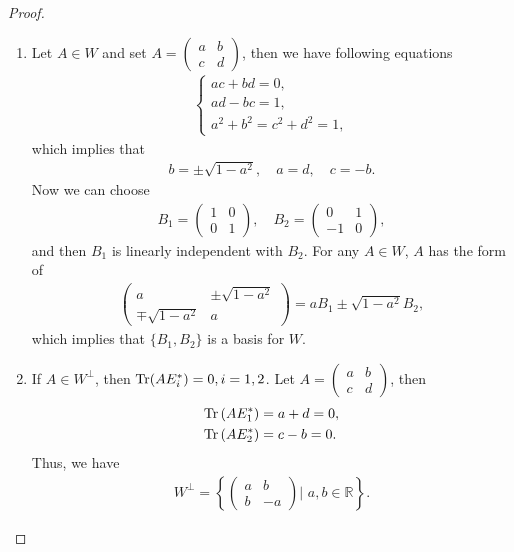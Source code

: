 \documentclass[11pt]{article}
\theoremstyle{definition}
\numberwithin{equation}{subsection}
\begin{document}
\begin{proof}
~\begin{enumerate}[label=(\alph*)]
    \item Let $A \in W$ and set $A = \begin{pmatrix} a & b \\ c & d
    \end{pmatrix}$, then we have following equations
    \begin{align*}
        \begin{cases}
            ac + bd = 0, \\
            ad - bc = 1, \\
            a^2 + b^2 = c^2 + d^2 = 1,
        \end{cases}
    \end{align*}
    which implies that
    \begin{align*}
        b = \pm \sqrt{1 - a^2}, \quad a = d, \quad c = -b.
    \end{align*}
    Now we can choose
    \begin{align*}
        B_1 = \begin{pmatrix} 1 & 0 \\ 0 & 1 \end{pmatrix},\quad 
        B_2 = \begin{pmatrix} 0 & 1 \\ -1 & 0 \end{pmatrix},
    \end{align*}
    and then $B_1$ is linearly independent with $B_2$. For any $A \in W$, $A$ has the form of
    \begin{align*}
        \begin{pmatrix} 
            a & \pm \sqrt{1 - a^2} \\ 
            \mp \sqrt{1 - a^2} & a
        \end{pmatrix} = a B_1 \pm \sqrt{1 - a^2} B_2,
    \end{align*}
    which implies that $\{B_1, B_2\}$ is a basis for $W$.
    
    \item If $A \in W^\bot$, then $\Tr(AE_i^*) = 0, i = 1, 2$. Let $A = \begin{pmatrix} a & b \\ c & d \end{pmatrix}$, then 
    \begin{align*}
        \Tr\left(AE_1^*\right) & = a + d = 0, \\
        \Tr\left(AE_2^*\right) & = c - b = 0.
    \end{align*}
    Thus, we have
    \begin{align*}
        W^\bot = \left\{\begin{pmatrix} a & b \\ b & -a \end{pmatrix} \Bigg| \,\, a, b \in \mathbb{R} \right\}.
    \end{align*}
    

\end{enumerate}
\end{proof}
\end{document}
